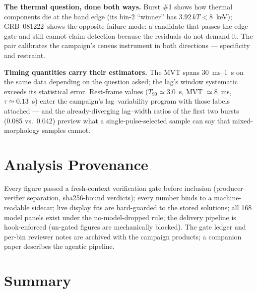\documentclass[twocolumn]{aastex631}
\newcommand{\grb}{GRB~081222}
\begin{document}
\textbf{The thermal question, done both ways.} Burst \#1 shows how thermal
components die at the band edge (its bin-2 ``winner'' has
$3.92\,kT < 8$~keV); \grb\ shows the opposite failure mode: a candidate that
passes the edge gate and still cannot claim detection because the residuals
do not demand it. The pair calibrates the campaign's census instrument in
both directions --- specificity and restraint.

\textbf{Timing quantities carry their estimators.} The MVT spans
$30$~ms--$1$~s on the same data depending on the question asked; the lag's
window systematic exceeds its statistical error. Rest-frame values
($T_{90} \simeq 3.0$~s, MVT $\simeq 8$~ms, $\tau \simeq 0.13$~s) enter the
campaign's lag--variability program \citep{2013ApJ...778....3S,
2025JARNA..11...27G} with those labels attached --- and the already-diverging
lag--width ratios of the first two bursts (0.085 vs.\ 0.042) preview what a
single-pulse-selected sample can say that mixed-morphology samples cannot.

\section{Analysis Provenance} \label{sec:provenance}

Every figure passed a fresh-context verification gate before inclusion
(producer--verifier separation, sha256-bound verdicts); every number binds to
a machine-readable sidecar; live display fits are hard-guarded to the stored
solutions; all 168 model panels exist under the no-model-dropped rule; the
delivery pipeline is hook-enforced (un-gated figures are mechanically
blocked). The gate ledger and per-bin reviewer notes are archived with the
campaign products; a companion paper describes the agentic pipeline.

\section{Summary} \label{sec:summary}
\end{document}
